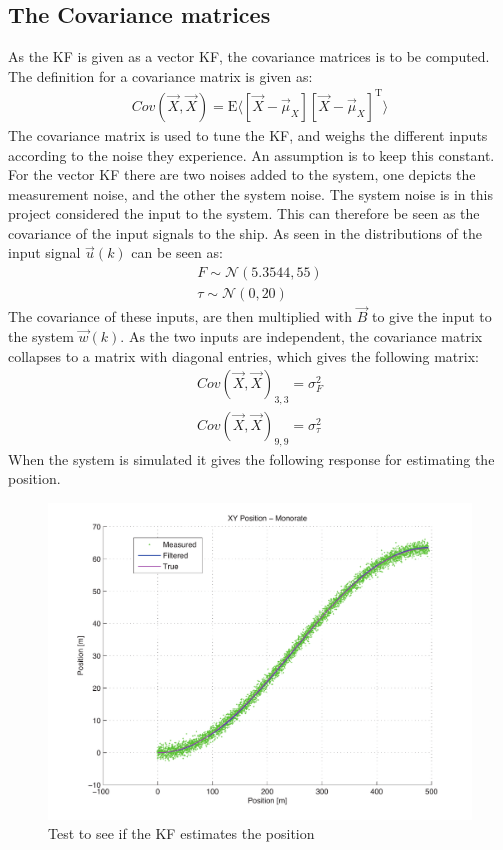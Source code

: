 \subsection{The Covariance matrices}
As the \ac{KF} is given as a vector \ac{KF}, the covariance matrices is to be computed. The definition for a covariance matrix is given as:
\begin{align}
Cov(\vec{X},\vec{X}) = \text{E}\langle[\vec{X} - \vec{\mu}_X][\vec{X} - \vec{\mu}_X]^\text{T}\rangle
\end{align}
The covariance matrix is used to tune the \ac{KF}, and weighs the different inputs according to the noise they experience. An assumption is to keep this constant. For the vector \ac{KF} there are two noises added to the system, one depicts the measurement noise, and the other the system noise. The system noise is in this project considered the input to the system. This can therefore be seen as the covariance of the input signals to the ship. As seen in  the distributions of the input signal $\vec{u}(k)$ can be seen as:
\begin{align}
F \sim \mathcal{N}(5.3544,55)\\
\tau \sim \mathcal{N}(0,20)
\end{align}
The covariance of these inputs, are then multiplied with $\vec{B}$ to give the input to the system $\vec{w}(k)$. As the two inputs are independent, the covariance matrix collapses to a matrix with diagonal entries, which gives the following matrix:
\begin{align}
Cov(\vec{X},\vec{X})_{3,3} = \sigma_{F}^2\\
Cov(\vec{X},\vec{X})_{9,9} = \sigma_{\tau}^2
\end{align}
When the system is simulated it gives the following response for estimating the position.
\begin{figure}[htbp]
	\centering
	\includegraphics[width=\textwidth]{img/kalmana}
	\caption{Test to see if the \ac{KF} estimates the position}
	\label{fig:kalmanA}
\end{figure}
